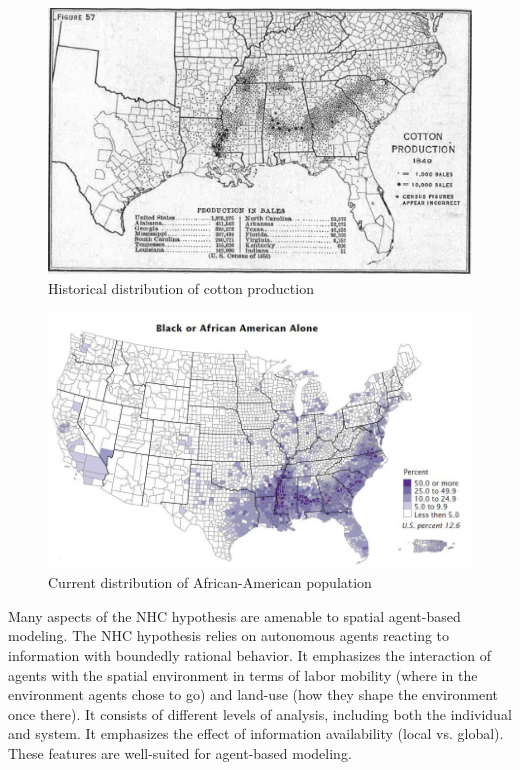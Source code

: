 \documentclass{article}
\begin{document}
\begin{figure}[h!]
\caption{Historical distribution of cotton production}
\includegraphics[scale=0.75]{historical}
\centering
\end{figure}

\begin{figure}[h!]
\caption{Current distribution of African-American population}
\includegraphics[scale=0.4]{current}
\centering
\end{figure}

Many aspects of the NHC hypothesis are amenable to spatial 
agent-based modeling. The NHC hypothesis relies on autonomous agents reacting to
information with boundedly rational behavior. It emphasizes the
interaction of agents with the spatial environment in terms of labor mobility
(where in the environment agents chose to go) and land-use (how they shape the
environment once there). It consists of different levels of analysis, including
both the individual and system. It emphasizes the effect of information
availability (local vs. global). These features are well-suited for agent-based
modeling.
\end{document}
